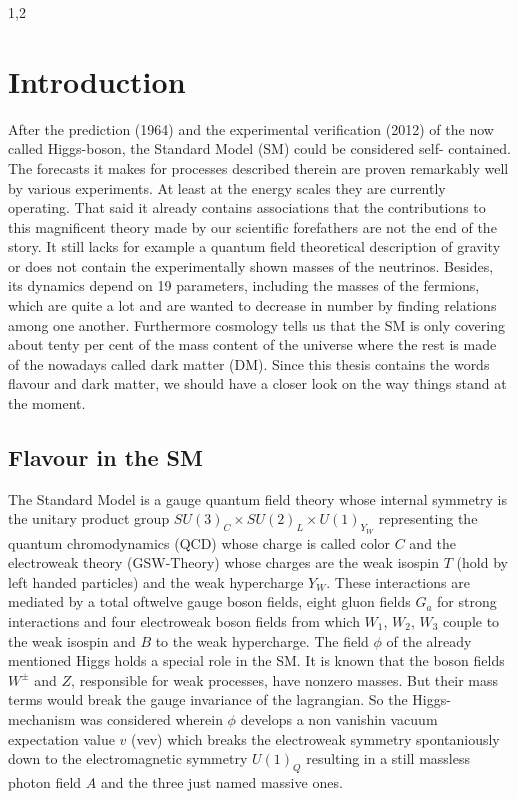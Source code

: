 \documentclass[11pt,a4paper,twoside]{article}
\begin{document}
\begin{spacing}{1,2}

\thispagestyle{empty}

\setcounter{page}{0}

\section{Introduction}
After the prediction (1964) and the experimental verification (2012) of the
now called Higgs-boson, the Standard Model (SM) could be considered self-
contained. The forecasts it makes for processes described therein are proven
remarkably well by various experiments. At least at the energy scales they
are currently operating. That said it already contains associations that the
contributions to this magnificent theory made by our scientific forefathers are
not the end of the story. It still lacks for example a quantum field theoretical
description of gravity or does not contain the experimentally shown masses
of the neutrinos. Besides, its dynamics depend on 19 parameters, including
the masses of the fermions, which are quite a lot and are wanted to decrease
in number by finding relations among one another. Furthermore cosmology
tells us that the SM is only covering about tenty per cent of the mass content
of the universe where the rest is made of the nowadays called dark matter
(DM). Since this thesis contains the words flavour and dark matter, we
should have a closer look on the way things stand at the moment.

\subsection{Flavour in the SM}
The Standard Model is a gauge quantum field theory whose internal symmetry is the unitary product group $SU(3)_C\times SU(2)_L\times U(1)_{Y_W}$ representing
the quantum chromodynamics (QCD) whose charge is called color $C$ and the electroweak theory (GSW-Theory) whose charges are the weak isospin $T$ 
(hold by left handed particles) and the 
weak hypercharge $Y_W$. These interactions are mediated by a total oftwelve gauge boson fields, eight gluon fields $G_a$ for strong interactions and four 
electroweak boson fields from which $W_1$, $W_2$, $W_3$ couple to the weak isospin and $B$ to the weak hypercharge. The field $\phi$ of the already mentioned 
Higgs holds a special role in the SM. It is known that the boson fields $W^\pm$ and $Z$, responsible for weak processes, have nonzero masses. But their
mass terms would break the gauge invariance of the lagrangian. So the Higgs-mechanism was considered wherein $\phi$ develops a non vanishin vacuum expectation
value $v$ (vev) which breaks the electroweak symmetry spontaniously down to the electromagnetic symmetry $U(1)_Q$ resulting in a still massless photon field 
$A$ and the three just named massive ones.

\end{spacing}
\end{document}
